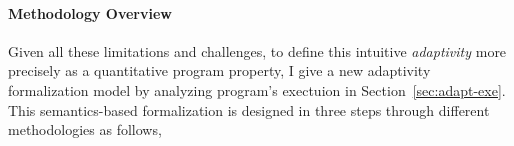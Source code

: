 \paragraph{Methodology Overview}
Given all these limitations and challenges,
to define this intuitive \emph{adaptivity} more precisely as a quantitative program property, 
I give a new adaptivity formalization model by analyzing program's exectuion in Section~\ref{sec:adapt-exe}.
 This semantics-based formalization is designed in three steps through different methodologies as follows,
